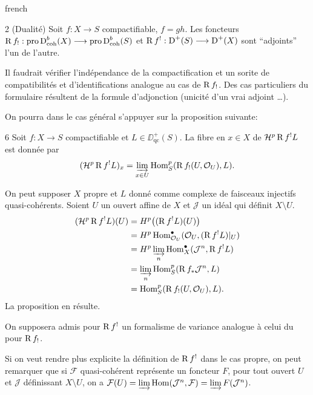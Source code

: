 \begin{hyphenrules}{french}
\begin{booktheorem}{2}\label{app:thm2}
(Dualit\'e) Soit $f: X \longrightarrow S$ compactifiable, $f = gh$. Les foncteurs $\operatorname{R} f_{!}: \operatorname{pro}\operatorname{D}_{\operatorname{coh}}^{b}(X) \longrightarrow \operatorname{pro}\operatorname{D}_{\operatorname{coh}}^{b}(S)$ et $\operatorname{R} f^{!}: \operatorname{D}^{+}(S) \longrightarrow \operatorname{D}^{+}(X)$ sont ``adjoints'' l'un de l'autre.
\end{booktheorem}

Il faudrait v\'erifier l'ind\'ependance de la compactification et un sorite de compatibilit\'es et d'identifications analogue au cas de $\operatorname{R} f_{!}$. Des cas particuliers du formulaire r\'esultent de la formule d'adjonction (unicit\'e d'un vrai adjoint \dots).

On pourra dans le cas g\'en\'eral s'appuyer sur la proposition suivante:

\begin{bookproposition}{6}\label{app:prop6}
Soit $f: X \longrightarrow S$ compactifiable et $L \in \DD_{\operatorname{qc}}^{+}(S)$. La fibre en $x \in X$ de $\mathcal{H}^{p}\operatorname{R} f^{!}L$ est donn\'ee par
\[
(\mathcal{H}^{p}\operatorname{R} f^{!}L)_{x} = \varinjlim_{x \in U} \operatorname{Hom}_{S}^{p}(\operatorname{R} f_{!}(U,\mathcal{O}_{U}), L).
\]
\end{bookproposition}

On peut supposer $X$ propre et $L$ donn\'e comme complexe de faisceaux injectifs quasi-coh\'erents. Soient $U$ un ouvert affine de $X$ et $\mathcal{J}$ un id\'eal qui d\'efinit $X\setminus U$.
\begin{align*}
(\mathcal{H}^{p}\operatorname{R} f^{!}L)(U)
 &= H^{p}\bigl((\operatorname{R} f^{!}L)(U)\bigr) \\
 &= H^{p}\operatorname{Hom}_{\mathcal{O}_{U}}^{\bullet}
       (\mathcal{O}_{U},(\operatorname{R} f^{!}L)|_{U}) \\
 &= H^{p}\varinjlim_{n}\operatorname{Hom}_{X}^{\bullet}
       (\mathcal{J}^{n},\operatorname{R} f^{!}L) \\
 &= \varinjlim_{n}\operatorname{Hom}_{S}^{p}(\operatorname{R} f_{*}\mathcal{J}^{n},L) \\
 &= \operatorname{Hom}_{S}^{p}(\operatorname{R} f_{!}(U,\mathcal{O}_{U}),L).
\end{align*}
La proposition en r\'esulte.

On supposera admis pour $\operatorname{R} f^{!}$ un formalisme de variance analogue \`a celui du  pour $\operatorname{R} f_{!}$.

Si on veut rendre plus explicite la d\'efinition de $\operatorname{R} f^{!}$ dans le cas propre, on peut remarquer que si $\mathcal{F}$ quasi-coh\'erent repr\'esente un foncteur $F$, pour tout ouvert $U$ et $\mathcal{J}$ d\'efinissant $X\setminus U$, on a $\mathcal{F}(U) = \varinjlim \operatorname{Hom}(\mathcal{J}^{n}, \mathcal{F}) = \varinjlim F(\mathcal{J}^{n})$.


\end{hyphenrules}

